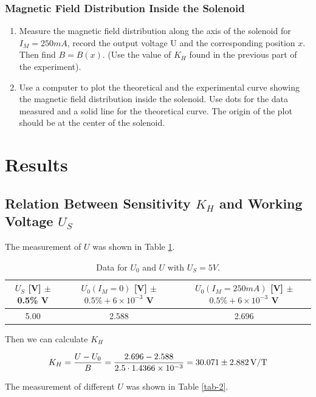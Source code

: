 \documentclass{article}
\begin{document}
\subsubsection{Magnetic Field Distribution Inside the Solenoid}
\begin{enumerate}
	\item Measure the magnetic field distribution along the axis of the solenoid for $ I_M = 250 mA $, record the output voltage U and the corresponding position $ x $. Then find $ B = B(x) $. (Use the value of $ K_H $ found in the previous part of the experiment).
	\item Use a computer to plot the theoretical and the experimental curve showing the magnetic field distribution inside the solenoid. Use dots for the data measured and a solid line for the theoretical curve. The origin of the plot should be at the center of the solenoid.
\end{enumerate}

\section{Results}


\subsection{Relation Between Sensitivity $ K_H $ and Working Voltage $ U_S $}

The measurement of $U$ was shown in Table \ref{tab-1}.

\begin{table}[!h]
\begin{center}
\begin{tabular}{|c|c|c|}
\hline
$U_S$ [V] $\pm$ 0.5\% V & $U_0(I_M=0)$ [V] $\pm$ $0.5\% +6\times10^{-3}$ V  &
$U_0(I_M=250mA)$ [V] $\pm$ $0.5\% +6\times10^{-3}$ V\\
\hline
5.00 & 2.588 & 2.696\\
\hline
\end{tabular}
\caption{Data for $U_0$ and $U$ with $U_S=5V$.}
\label{tab-1}
\end{center}
\end{table}

Then we can calculate $K_H$

$$K_H=\frac{U-U_0}{B}=\frac{2.696-2.588}{2.5\cdot1.4366\times10^{-3}}=30.071\pm2.882\,\rm{V/T}$$

The measurement of different $U$ was shown in Table \ref{tab-2}.
\end{document}
